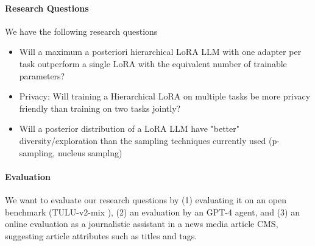 \documentclass{article}
\begin{document}
\paragraph{Research Questions}
We have the following research questions
\begin{itemize}
    \item Will a maximum a posteriori hierarchical LoRA LLM  with one adapter per task outperform a single LoRA with the equivalent number of trainable parameters?
    \item Privacy: Will training a Hierarchical LoRA on multiple tasks be more privacy friendly than training on two tasks jointly?
    \item Will a posterior distribution of a LoRA LLM have "better" diversity/exploration than the sampling techniques currently used (p-sampling, nucleus samplng)
\end{itemize}

\paragraph{Evaluation}
We want to evaluate our research questions by (1) evaluating it on an open benchmark (TULU-v2-mix \cite{ivison_camels_2023}), (2) an evaluation by an GPT-4 agent, and (3) an online evaluation as a journalistic assistant in a news media article CMS, suggesting article attributes such as titles and tags.



\printbibliography
\end{document}
